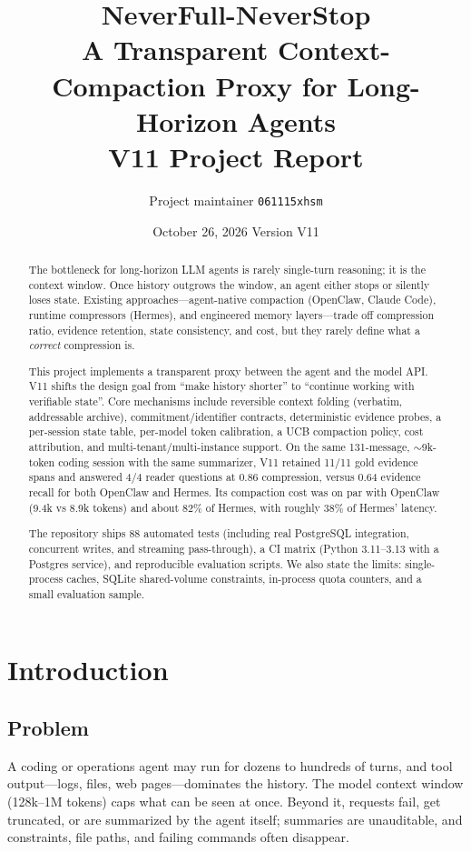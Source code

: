 \documentclass[11pt,a4paper]{article}
\title{\bfseries NeverFull-NeverStop\\[4pt]
\large A Transparent Context-Compaction Proxy for Long-Horizon Agents\\[2pt]
\normalsize V11 Project Report}
\author{Project maintainer \quad \texttt{061115xhsm}}
\date{October 26, 2026 \quad Version V11}
\begin{document}
\maketitle

\begin{abstract}
The bottleneck for long-horizon LLM agents is rarely single-turn reasoning; it is the context window. Once history outgrows the window, an agent either stops or silently loses state. Existing approaches---agent-native compaction (OpenClaw, Claude Code), runtime compressors (Hermes), and engineered memory layers---trade off compression ratio, evidence retention, state consistency, and cost, but they rarely define what a \emph{correct} compression is.

This project implements a transparent proxy between the agent and the model API. V11 shifts the design goal from ``make history shorter'' to ``continue working with verifiable state''. Core mechanisms include reversible context folding (verbatim, addressable archive), commitment/identifier contracts, deterministic evidence probes, a per-session state table, per-model token calibration, a UCB compaction policy, cost attribution, and multi-tenant/multi-instance support. On the same 131-message, $\sim$9k-token coding session with the same summarizer, V11 retained 11/11 gold evidence spans and answered 4/4 reader questions at 0.86 compression, versus 0.64 evidence recall for both OpenClaw and Hermes. Its compaction cost was on par with OpenClaw (9.4k vs 8.9k tokens) and about 82\% of Hermes, with roughly 38\% of Hermes' latency.

The repository ships 88 automated tests (including real PostgreSQL integration, concurrent writes, and streaming pass-through), a CI matrix (Python 3.11--3.13 with a Postgres service), and reproducible evaluation scripts. We also state the limits: single-process caches, SQLite shared-volume constraints, in-process quota counters, and a small evaluation sample.
\end{abstract}

\tableofcontents
\newpage

\section{Introduction}

\subsection{Problem}
A coding or operations agent may run for dozens to hundreds of turns, and tool output---logs, files, web pages---dominates the history. The model context window (128k--1M tokens) caps what can be seen at once. Beyond it, requests fail, get truncated, or are summarized by the agent itself; summaries are unauditable, and constraints, file paths, and failing commands often disappear.
\end{document}
